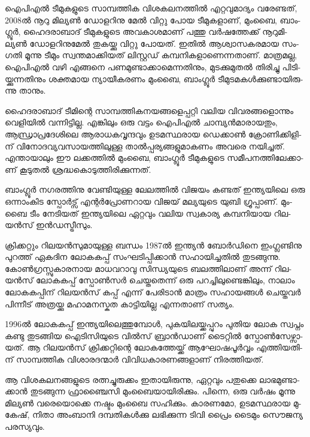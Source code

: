 \vskip 2pt

ഐ­പി­എല്‍ ടീ­മു­ക­ളു­ടെ സാ­മ്പ­ത്തിക വി­ശ­ക­ല­ന­ത്തില്‍ എറ്റ­വു­മാ­ദ്യം വരേ­ണ്ട­ത്, 2008ല്‍ നൂ­റു മി­ല്യണ്‍ ഡോ­ള­റി­നു മേല്‍ 
വി­റ്റു പോയ ടീ­മു­ക­ളാ­ണ്, മും­ബൈ, ബാം­ഗ്ലൂര്‍, ഹൈ­ദ­രാ­ബാ­ദ് ടീ­മു­ക­ളു­ടെ അവ­കാ­ശ­മാ­ണ് പത്തു വര്‍­ഷ­ത്തേ­ക്ക് 
നൂ­റു­മി­ല്യണ്‍ ഡോ­ള­റി­നു­മേല്‍ തു­ക­യ്ക്കു വി­റ്റു പോ­യ­ത്. ഇതില്‍ ആശ്വാ­സ­ക­ര­മായ സം­ഗ­തി മൂ­ന്നു ടീ­മും സ്വ­ന്ത­മാ­ക്കി­യ­ത് 
ലി­സ്റ്റ­ഡ് കമ്പ­നി­ക­ളാ­ണെ­ന്ന­താ­ണ്. മാ­ത്ര­മ­ല്ല, ഐ­പി­എല്‍ വഴി എങ്ങ­നെ പണ­മു­ണ്ടാ­ക്കാ­മെ­ന്ന­തി­നും, മു­ട­ക്കു­മു­തല്‍ തി­രി­ച്ചു 
പി­ടി­യ്ക്കു­ന്ന­തി­നും ശക്ത­മായ ന്യാ­യീ­ക­ര­ണം മും­ബൈ, ബാം­ഗ്ലൂര്‍ ടീ­മു­ട­മ­കള്‍­ക്കു­ണ്ടാ­യി­രു­ന്നു താ­നും.

­ഹൈ­ദ­രാ­ബാ­ദ് ടീ­മി­ന്റെ സാ­മ്പ­ത്തി­ക­ന­യ­ങ്ങ­ളെ­പ്പ­റ്റി വലിയ വി­വ­ര­ങ്ങ­ളൊ­ന്നും വെ­ളി­യില്‍ വന്നി­ട്ടി­ല്ല. എങ്കി­ലും ഒരു വട്ടം 
ഐപി­എല്‍ ചാ­മ്പ്യന്‍­മാ­രാ­യ­തും, ആന്ധ്രാ­പ്ര­ദേ­ശി­ലെ ആരാ­ധ­ക­വൃ­ന്ദ­വും ഉട­മ­സ്ഥ­രായ ഡെ­ക്കാണ്‍ ക്രോ­ണി­ക്കി­ളി­ന് 
വി­നോ­ദ­വ്യ­വ­സാ­യ­ത്തി­ലു­ള്ള താല്‍­പ്പ­ര്യ­ങ്ങ­ളു­മാ­ക­ണം അവ­രെ നയി­ച്ച­ത്. എന്താ­യാ­ലും ഈ ലക്ക­ത്തില്‍ മും­ബൈ, 
ബാം­ഗ്ലൂര്‍ ടീ­മു­ക­ളു­ടെ സമീ­പ­ന­ത്തി­ലേ­ക്കാ­ണ് കൂ­ടു­തല്‍ ശ്ര­ദ്ധ­കൊ­ടു­ത്തി­രി­ക്കു­ന്ന­ത്.

­ബാം­ഗ്ലൂര്‍ നഗ­ര­ത്തി­നു വേ­ണ്ടി­യു­ള്ള ലേ­ല­ത്തില്‍ വി­ജ­യം കണ്ട­ത് ഇന്ത്യ­യി­ലെ ഒരു ഒന്നാം­കിട സ്പോര്‍­ട്സ് എന്റര്‍­പ്രോ­ണ­റായ 
വി­ജ­യ് മല്യ­യു­ടെ യു­ബി ഗ്രൂ­പ്പാ­ണ്. മും­ബൈ ടീം നേ­ടി­യ­ത് ഇന്ത്യ­യി­ലെ ഏറ്റ­വും വലിയ സ്വ­കാ­ര്യ കമ്പ­നി­യായ ­റി­ല­യന്‍­സ് 
ഇന്‍­ഡ­സ്ട്രീ­സും­.


­ക്രി­ക്ക­റ്റും റി­ല­യന്‍­സു­മാ­യു­ള്ള ബന്ധം 1987ല്‍ ഇന്ത്യന്‍ ബോര്‍­ഡി­നെ ഇം­ഗ്ല­ണ്ടി­നു പു­റ­ത്ത് ഏക­ദിന ലോ­ക­ക­പ്പ് 
സം­ഘ­ടി­പ്പി­ക്കാന്‍ സഹാ­യി­ച്ച­തില്‍ തു­ട­ങ്ങു­ന്നു. കോണ്‍­ഗ്ര­സ്സു­കാ­ര­നായ മാ­ധ­വ­റാ­വു സി­ന്ധ്യ­യു­ടെ ബല­ത്തി­ലാ­ണ് 
അന്ന് റി­ല­യന്‍­സ് ലോ­ക­ക­പ്പ് സ്പോണ്‍­സര്‍ ചെ­യ്ത­തെ­ന്ന് ഒരു പറ­ച്ചി­ലു­ണ്ടെ­ങ്കി­ലും, നാ­ലാം ലോ­ക­ക­പ്പി­ന് റി­ല­യന്‍­സ് 
കപ്പ് എന്ന് പേ­രി­ടാന്‍ മാ­ത്രം സഹാ­യ­ങ്ങള്‍ ചെ­യ്ത­വര്‍ പി­ന്നീ­ട് അത്ര­യ്ക്കു മഹാ­മ­ന­സ്കത കാ­ട്ടി­യി­ല്ല എന്ന­താ­ണ് സത്യം.

1996ല്‍ ലോ­ക­ക­പ്പ് ഇന്ത്യ­യി­ലെ­ത്തു­മ്പോള്‍, പു­ക­യി­ല­യ്ക്ക­പ്പു­റം പു­തിയ ലോക സ്വ­പ്നം കണ്ടു തു­ട­ങ്ങിയ ഐടി­സി­യു­ടെ 
വില്‍­സ് ബ്രാന്‍­ഡാ­ണ് ടൈ­റ്റില്‍ സ്പോണ്‍­സേ­ഴ്സാ­യ­ത്. ആ റി­ല­യന്‍­സ് ക്രി­ക്ക­റ്റി­ന്റെ ലോ­ക­ത്തേ­യ്ക്ക് ആഘോ­ഷ­പൂര്‍‌­വ്വം 
എത്തി­യ­തി­ന് സാ­മ്പ­ത്തിക വി­ശാ­ര­ദ­ന്മാര്‍ വി­വി­ധ­കാ­ര­ണ­ങ്ങ­ളാ­ണ് നി­ര­ത്തി­യ­ത്.

ആ വി­ശ­ക­ല­ന­ങ്ങ­ളു­ടെ രത്ന­ച്ചു­രു­ക്കം ഇതാ­യി­രു­ന്നു, ഏറ്റ­വും പതു­ക്കെ ലാ­ഭ­മു­ണ്ടാ­ക്കാന്‍ തു­ട­ങ്ങു­ന്ന ഫ്രാ­ഞ്ചൈ­സി 
മും­ബൈ­യാ­യി­രി­ക്കും. പി­ന്നെ, ഒരു വര്‍­ഷം മൂ­ന്നു മി­ല്യണ്‍ വരെ­യൊ­ക്കെ നഷ്ടം മും­ബൈ സഹി­ക്കും. കാ­ര­ണ­മോ, 
ഉട­മ­സ്ഥ­രായ മു­കേ­ഷ്, നി­താ അം­ബാ­നി ദമ്പ­തി­കള്‍­ക്കു ലഭി­ക്കു­ന്ന ടി­വി പ്രൈം ടൈ­മും സൌ­ജ­ന്യ പര­സ്യ­വും­.

